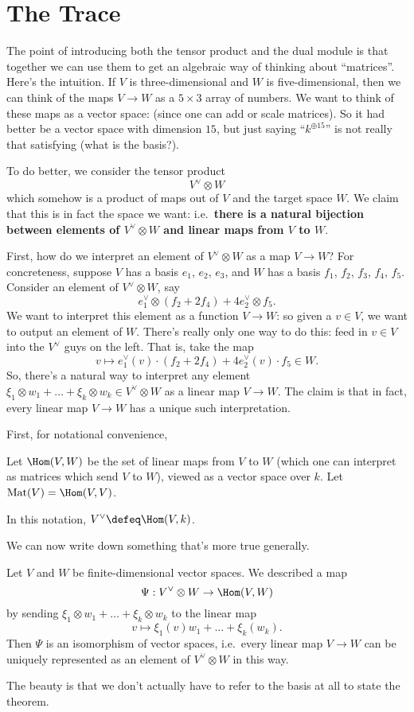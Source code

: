 \section{The Trace}
The point of introducing both the tensor product and the dual module is that together
we can use them to get an algebraic way of thinking about ``matrices''.
Here's the intuition.
If $V$ is three-dimensional and $W$ is five-dimensional, then we can think
of the maps $V \to W$ as a $5 \times 3$ array of numbers.
We want to think of these maps as a vector space:
(since one can add or scale matrices).
So it had better be a vector space with dimension $15$,
but just saying ``$k^{\oplus 15}$'' is not really that satisfying
(what is the basis?).

To do better, we consider the tensor product \[ V^\vee \otimes W \]
which somehow is a product of maps out of $V$ and the target space $W$.
We claim that this is in fact the space we want:
i.e.\ \textbf{there is a natural bijection between elements of $V^\vee \otimes W$
and linear maps from $V$ to $W$}.

First, how do we interpret an element of $V^\vee \otimes W$ as a map $V \to W$?
For concreteness, suppose $V$ has a basis $e_1$, $e_2$, $e_3$,
and $W$ has a basis $f_1$, $f_2$, $f_3$, $f_4$, $f_5$.
Consider an element of $V^\vee \otimes W$, say
\[ e_1^\vee \otimes (f_2 + 2f_4) + 4e_2^\vee \otimes f_5. \]
We want to interpret this element as a function $V \to W$:
so given a $v \in V$,
we want to output an element of $W$.
There's really only one way to do this:
feed in $v \in V$ into the $V^\vee$ guys on the left.
That is, take the map
\[ v \mapsto e_1^\vee(v) \cdot (f_2 + 2f_4) + 4e_2^\vee(v) \cdot f_5 \in W. \]
So, there's a natural way to interpret any element
$\xi_1 \otimes w_1 + \dots + \xi_k \otimes w_k \in V^\vee \otimes W$
as a linear map $V \to W$.
The claim is that in fact, every linear map $V \to W$ has a unique such interpretation.

First, for notational convenience,
\begin{definition}
	Let $\Hom(V,W)$ be the set of linear maps from $V$ to $W$
	(which one can interpret as matrices which send $V$ to $W$),
	viewed as a vector space over $k$.
	Let $\Mat(V) = \Hom(V,V)$.
\end{definition}
In this notation, $V^\vee \defeq \Hom(V,k)$.

We can now write down something that's more true generally.
\begin{theorem}
	Let $V$ and $W$ be finite-dimensional vector spaces.
	We described a map
	\[ \Psi : V^\vee \otimes W \to \Hom(V,W) \]
	by sending $\xi_1 \otimes w_1 + \dots + \xi_k \otimes w_k$ to the linear map
	\[ v \mapsto \xi_1(v) w_1 + \dots + \xi_k (w_k). \]
	Then $\Psi$ is an isomorphism of vector spaces, i.e.\ every linear map $V \to W$
	can be uniquely represented as an element of $V^\vee \otimes W$ in this way.
\end{theorem}
The beauty is that we don't actually have to refer to the basis at all to state the theorem.

